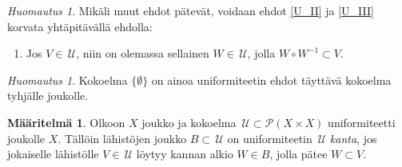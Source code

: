 \documentclass[12pt,a4paper,leqno]{report}
\newcommand{\U}{\,\mathcal{U}}
\newcommand{\Pot}{\mathcal{P}}
\theoremstyle{plain}
\newtheorem{kor}[equation]{Korollaari}
\theoremstyle{definition}
\newtheorem{maar}[equation]{Määritelmä}
\theoremstyle{remark}
\newtheorem{huom}[equation]{Huomautus}
\begin{document}
\begin{huom}\label{UaHuom}
Mikäli muut ehdot pätevät, voidaan ehdot \ref{U_II} ja \ref{U_III} korvata yhtäpitävällä ehdolla: 
\begin{enumerate} [label=(Ua),ref=(Ua)]
\item \label{Uaehto} 
Jos $V\in \U$, niin on olemassa sellainen $W\in \U$, jolla $ W\circ W^{-1}\subset V$.
\end{enumerate}
%
\end{huom}
\begin{huom}
Kokoelma $\{\emptyset\}$ on ainoa uniformiteetin ehdot täyttävä kokoelma tyhjälle joukolle.
\end{huom}
\begin{maar}\label{uniformi_kanta}
Olkoon $X$ joukko ja kokoelma $\U\subset \Pot (X\times X)$ uniformiteetti 
joukolle $X$. Tällöin lähistöjen joukko $B\subset \U$ on 
uniformiteetin $\U$ \emph{kanta}, jos jokaiselle lähistölle $V\in\U$ löytyy 
kannan alkio $W\in B$, jolla pätee $W\subset V$.
\end{maar}
\end{document}
